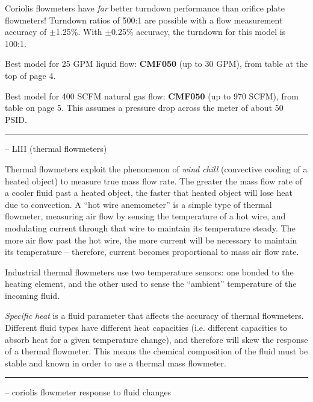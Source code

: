 \vskip 10pt

Coriolis flowmeters have {\it far} better turndown performance than orifice plate flowmeters!  Turndown ratios of 500:1 are possible with a flow measurement accuracy of $\pm$1.25\%.  With $\pm$0.25\% accuracy, the turndown for this model is 100:1.

\vskip 10pt

Best model for 25 GPM liquid flow: {\bf CMF050} (up to 30 GPM), from table at the top of page 4.

\vskip 10pt

Best model for 400 SCFM natural gas flow: {\bf CMF050} (up to 970 SCFM), from table on page 5.  This assumes a pressure drop across the meter of about 50 PSID.


\filbreak \vskip 5pt \hrule \vskip 5pt  -- LIII (thermal flowmeters) \vskip 10pt

Thermal flowmeters exploit the phenomenon of {\it wind chill} (convective cooling of a heated object) to measure true mass flow rate.  The greater the mass flow rate of a cooler fluid past a heated object, the faster that heated object will lose heat due to convection.  A ``hot wire anemometer'' is a simple type of thermal flowmeter, measuring air flow by sensing the temperature of a hot wire, and modulating current through that wire to maintain its temperature steady.  The more air flow past the hot wire, the more current will be necessary to maintain its temperature -- therefore, current becomes proportional to mass air flow rate.

\vskip 10pt

Industrial thermal flowmeters use two temperature sensors: one bonded to the heating element, and the other used to sense the ``ambient'' temperature of the incoming fluid.

\vskip 10pt

{\it Specific heat} is a fluid parameter that affects the accuracy of thermal flowmeters.  Different fluid types have different heat capacities (i.e. different capacities to absorb heat for a given temperature change), and therefore will skew the response of a thermal flowmeter.  This means the chemical composition of the fluid must be stable and known in order to use a thermal mass flowmeter.


\filbreak \vskip 5pt \hrule \vskip 5pt  -- coriolis flowmeter response to fluid changes \vskip 10pt


